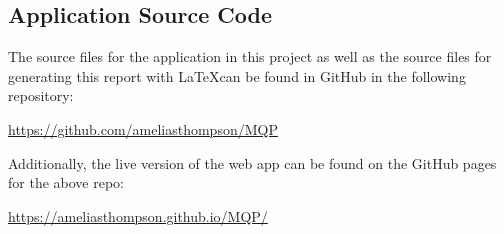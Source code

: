 \documentclass[12pt]{report}
\begin{document}



%

\begin{appendices}

\chapter{Application Source Code}
\label{ch:App Source Code}

The source files for the application in this project as well as the source files for generating this report with \LaTeX can be found in GitHub in the following repository:

\noindent\url{https://github.com/ameliasthompson/MQP}

\noindent Additionally, the live version of the web app can be found on the GitHub pages for the above repo:

\noindent\url{https://ameliasthompson.github.io/MQP/}

\end{appendices}
\end{document}
